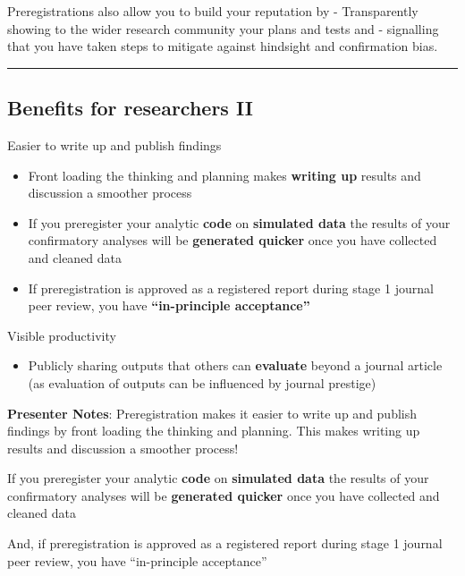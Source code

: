 \documentclass[
  letterpaper,
  DIV=11,
  numbers=noendperiod]{scrartcl}
\providecommand{\tightlist}{%
  \setlength{\itemsep}{0pt}\setlength{\parskip}{0pt}}
\begin{document}
Preregistrations also allow you to build your reputation by -
Transparently showing to the wider research community your plans and
tests and - signalling that you have taken steps to mitigate against
hindsight and confirmation bias.

\begin{center}\rule{0.5\linewidth}{0.5pt}\end{center}

\subsection{Benefits for researchers
II}\label{benefits-for-researchers-ii}

Easier to write up and publish findings

\begin{itemize}
\item
  Front loading the thinking and planning makes \textbf{writing up}
  results and discussion a smoother process
\item
  If you preregister your analytic \textbf{code} on \textbf{simulated
  data} the results of your confirmatory analyses will be
  \textbf{generated quicker} once you have collected and cleaned data
\item
  If preregistration is approved as a registered report during stage 1
  journal peer review, you have \textbf{``in-principle acceptance''}
\end{itemize}

Visible productivity

\begin{itemize}
\tightlist
\item
  Publicly sharing outputs that others can \textbf{evaluate} beyond a
  journal article (as evaluation of outputs can be influenced by journal
  prestige)
\end{itemize}

\textbf{Presenter Notes}: Preregistration makes it easier to write up
and publish findings by front loading the thinking and planning. This
makes writing up results and discussion a smoother process!

If you preregister your analytic \textbf{code} on \textbf{simulated
data} the results of your confirmatory analyses will be
\textbf{generated quicker} once you have collected and cleaned data

And, if preregistration is approved as a registered report during stage
1 journal peer review, you have ``in-principle acceptance''
\end{document}
